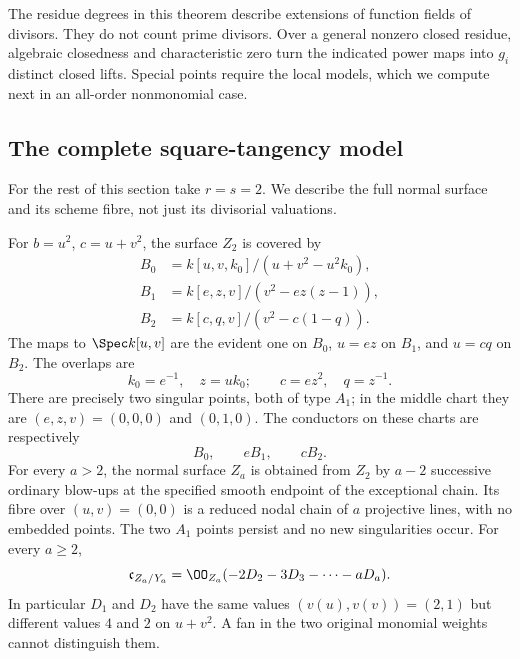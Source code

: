 The residue degrees in this theorem describe extensions of function
fields of divisors. They do not count prime divisors. Over a general
nonzero closed residue, algebraic closedness and characteristic zero
turn the indicated power maps into $g_i$ distinct closed lifts. Special
points require the local models, which we compute next in an all-order
nonmonomial case.

\subsection{The complete square-tangency model}
For the rest of this section take $r=s=2$. We describe the full
normal surface and its scheme fibre, not just its divisorial valuations.

\begin{theorem}
\label{thm:square-tangency-v171}
For $b=u^2$, $c=u+v^2$, the surface $Z_2$ is covered by
\begin{align}
 B_0&=k[u,v,k_0]/(u+v^2-u^2k_0),\label{eq:square-chart-zero-v171}\\
 B_1&=k[e,z,v]/(v^2-ez(z-1)),\label{eq:square-chart-one-v171}\\
 B_2&=k[c,q,v]/(v^2-c(1-q)).\label{eq:square-chart-two-v171}
\end{align}
The maps to $\Spec k[u,v]$ are the evident one on $B_0$,
$u=ez$ on $B_1$, and $u=cq$ on $B_2$. The overlaps are
\[
 k_0=e^{-1},\quad z=uk_0;
 \qquad c=ez^2,\quad q=z^{-1}.
\]
There are precisely two singular points, both of type $A_1$; in the
middle chart they are $(e,z,v)=(0,0,0)$ and $(0,1,0)$.
The conductors on these charts are respectively
\begin{equation}\label{eq:square-chart-conductors-v171}
 B_0,\qquad eB_1,\qquad cB_2.
\end{equation}
For every $a>2$, the normal surface $Z_a$ is obtained from $Z_2$ by
$a-2$ successive ordinary blow-ups at the specified smooth endpoint
of the exceptional chain. Its fibre over $(u,v)=(0,0)$ is a reduced
nodal chain of $a$ projective lines, with no embedded points. The two
$A_1$ points persist and no new singularities occur. For every $a\geq2$,
\begin{equation}\label{eq:square-global-conductor-v171}
 \mathfrak c_{Z_a/Y_a}
 =\OO_{Z_a}(-2D_2-3D_3-\cdots-aD_a).
\end{equation}
In particular $D_1$ and $D_2$ have the same values
$(v(u),v(v))=(2,1)$ but different values $4$ and $2$ on $u+v^2$.
A fan in the two original monomial weights cannot distinguish them.
\end{theorem}
